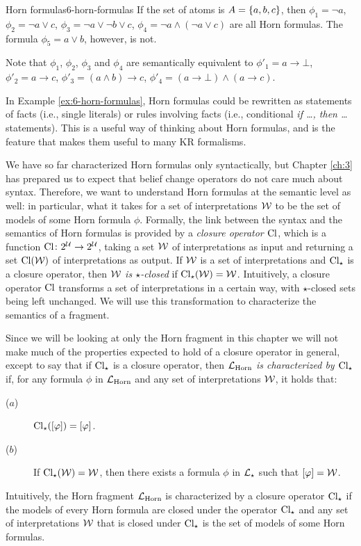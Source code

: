 \begin{xmpl}{Horn formulas}{6-horn-formulas}
	If the set of atoms is $A=\{a,b,c\}$,
	then 
	$\phi_{1} = \lnot a$,
	$\phi_{2} = \lnot a \lor c$,
	$\phi_{3} = \lnot a \lor \lnot b \lor c$,
	$\phi_{4} = \lnot a \land(\lnot a \lor c)$
	are all Horn formulas.
	The formula $\phi_{5}=a\lor b$, however, is not.

	Note that $\phi_1$, $\phi_2$, $\phi_3$ and $\phi_4$
	are semantically equivalent to 
	$\phi'_{1} = a\rightarrow\bot$,
	$\phi'_{2} = a\rightarrow c$,
	$\phi'_{3} = (a\land b) \rightarrow c$,
	$\phi'_{4} = (a\rightarrow\bot)\land(a\rightarrow c)$.
\end{xmpl}
In Example \ref{ex:6-horn-formulas}, 
Horn formulas could be rewritten as statements of facts
(i.e., single literals)
or rules involving facts 
(i.e., conditional \emph{if \dots, then \dots} statements).
This is a useful way of thinking about Horn formulas,
and is the feature that makes them useful to many KR formalisms.

We have so far characterized Horn formulas 
only syntactically,
but Chapter \ref{ch:3} has prepared us to expect that
belief change operators do not care much about syntax.
Therefore, we want to understand
Horn formulas at the semantic level as well:
in particular, what it takes for a set of interpretations $\mathcal{W}$
to be the set of models of some Horn formula $\phi$.
Formally, the link between the syntax and the semantics of Horn formulas
is provided by 
a \emph{closure operator ${\operatorname{Cl}}$},
which is a function ${\operatorname{Cl}}\colon 2^{\mathcal{U}}\rightarrow 2^{\mathcal{U}}$,
taking a set $\mathcal{W}$ of interpretations as input and returning 
a set ${\operatorname{Cl}}(\mathcal{W})$ of interpretations as output.
If $\mathcal{W}$ is a set of interpretations and ${\operatorname{Cl}}_{\star}$ is a closure operator,
then \emph{$\mathcal{W}$ is $\star$-closed} if ${\operatorname{Cl}}_{\star}(\mathcal{W})=\mathcal{W}$.
Intuitively, a closure operator ${\operatorname{Cl}}$ transforms a set of 
interpretations in a certain way,
with $\star$-closed sets being left unchanged. 
We will use this transformation
to characterize the semantics of a fragment.

Since we will be looking at only the Horn fragment in this chapter
we will not make much of the properties expected to hold
of a closure operator in general,
except to say that 
if ${\operatorname{Cl}}_{\star}$ is a closure operator,
then \emph{$\mathcal{L}_{\mathrm{Horn}}$ is characterized by ${\operatorname{Cl}}_{\star}$} if,
for any formula $\phi$
in $\mathcal{L}_{\mathrm{Horn}}$
and any set of interpretations $\mathcal{W}$,
it holds that:
\begin{description}
	\item[($a$)] ${\operatorname{Cl}}_{\star}([\varphi]) = [\varphi]$.
	\item[($b$)] If ${\operatorname{Cl}}_{\star}(\mathcal{W}) = \mathcal{W}$, 
		then there exists a formula $\phi$ in $\mathcal{L}_{\star}$
		such that $[\varphi]=\mathcal{W}$.
\end{description}
Intuitively, the Horn fragment $\mathcal{L}_{\mathrm{Horn}}$ is characterized by a 
closure operator ${\operatorname{Cl}}_{\star}$ if the models of every Horn formula 
are closed under the operator ${\operatorname{Cl}}_{\star}$
and any set of interpretations $\mathcal{W}$ 
that is closed under ${\operatorname{Cl}}_{\star}$
is the set of models of some Horn formulas.

